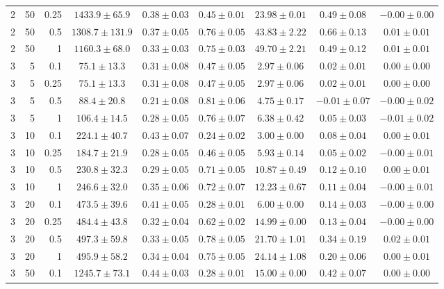 \begin{table}[htbp]
\begin{tabular}{@{}rrrcccccc@{}}
2 & 50 & 0.25 & $1433.9 \pm 65.9$ & $0.38 \pm 0.03$ & $0.45 \pm 0.01$ & $23.98 \pm 0.01$ & $0.49 \pm 0.08$ & $-0.00 \pm 0.00$ \\
2 & 50 & 0.5 & $1308.7 \pm 131.9$ & $0.37 \pm 0.05$ & $0.76 \pm 0.05$ & $43.83 \pm 2.22$ & $0.66 \pm 0.13$ & $0.01 \pm 0.01$ \\
2 & 50 & 1 & $1160.3 \pm 68.0$ & $0.33 \pm 0.03$ & $0.75 \pm 0.03$ & $49.70 \pm 2.21$ & $0.49 \pm 0.12$ & $0.01 \pm 0.01$ \\
\midrule
3 & 5 & 0.1 & $75.1 \pm 13.3$ & $0.31 \pm 0.08$ & $0.47 \pm 0.05$ & $2.97 \pm 0.06$ & $0.02 \pm 0.01$ & $0.00 \pm 0.00$ \\
3 & 5 & 0.25 & $75.1 \pm 13.3$ & $0.31 \pm 0.08$ & $0.47 \pm 0.05$ & $2.97 \pm 0.06$ & $0.02 \pm 0.01$ & $0.00 \pm 0.00$ \\
3 & 5 & 0.5 & $88.4 \pm 20.8$ & $0.21 \pm 0.08$ & $0.81 \pm 0.06$ & $4.75 \pm 0.17$ & $-0.01 \pm 0.07$ & $-0.00 \pm 0.02$ \\
3 & 5 & 1 & $106.4 \pm 14.5$ & $0.28 \pm 0.05$ & $0.76 \pm 0.07$ & $6.38 \pm 0.42$ & $0.05 \pm 0.03$ & $-0.01 \pm 0.02$ \\
3 & 10 & 0.1 & $224.1 \pm 40.7$ & $0.43 \pm 0.07$ & $0.24 \pm 0.02$ & $3.00 \pm 0.00$ & $0.08 \pm 0.04$ & $0.00 \pm 0.01$ \\
3 & 10 & 0.25 & $184.7 \pm 21.9$ & $0.28 \pm 0.05$ & $0.46 \pm 0.05$ & $5.93 \pm 0.14$ & $0.05 \pm 0.02$ & $-0.00 \pm 0.01$ \\
3 & 10 & 0.5 & $230.8 \pm 32.3$ & $0.29 \pm 0.05$ & $0.71 \pm 0.05$ & $10.87 \pm 0.49$ & $0.12 \pm 0.10$ & $0.00 \pm 0.01$ \\
3 & 10 & 1 & $246.6 \pm 32.0$ & $0.35 \pm 0.06$ & $0.72 \pm 0.07$ & $12.23 \pm 0.67$ & $0.11 \pm 0.04$ & $-0.00 \pm 0.01$ \\
3 & 20 & 0.1 & $473.5 \pm 39.6$ & $0.41 \pm 0.05$ & $0.28 \pm 0.01$ & $6.00 \pm 0.00$ & $0.14 \pm 0.03$ & $-0.00 \pm 0.00$ \\
3 & 20 & 0.25 & $484.4 \pm 43.8$ & $0.32 \pm 0.04$ & $0.62 \pm 0.02$ & $14.99 \pm 0.00$ & $0.13 \pm 0.04$ & $-0.00 \pm 0.00$ \\
3 & 20 & 0.5 & $497.3 \pm 59.8$ & $0.33 \pm 0.05$ & $0.78 \pm 0.05$ & $21.70 \pm 1.01$ & $0.34 \pm 0.19$ & $0.02 \pm 0.01$ \\
3 & 20 & 1 & $495.9 \pm 58.2$ & $0.34 \pm 0.04$ & $0.75 \pm 0.05$ & $24.14 \pm 1.08$ & $0.20 \pm 0.06$ & $0.00 \pm 0.01$ \\
3 & 50 & 0.1 & $1245.7 \pm 73.1$ & $0.44 \pm 0.03$ & $0.28 \pm 0.01$ & $15.00 \pm 0.00$ & $0.42 \pm 0.07$ & $0.00 \pm 0.00$ \\

\end{tabular}
\end{table}
